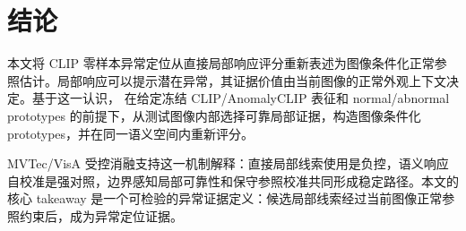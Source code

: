 \section{结论}

本文将 CLIP 零样本异常定位从直接局部响应评分重新表述为图像条件化正常参照估计。局部响应可以提示潜在异常，其证据价值由当前图像的正常外观上下文决定。基于这一认识，\method{} 在给定冻结 CLIP/AnomalyCLIP 表征和 normal/abnormal prototypes 的前提下，从测试图像内部选择可靠局部证据，构造图像条件化 prototypes，并在同一语义空间内重新评分。

MVTec/VisA 受控消融支持这一机制解释：直接局部线索使用是负控，语义响应自校准是强对照，边界感知局部可靠性和保守参照校准共同形成稳定路径。本文的核心 takeaway 是一个可检验的异常证据定义：候选局部线索经过当前图像正常参照约束后，成为异常定位证据。
